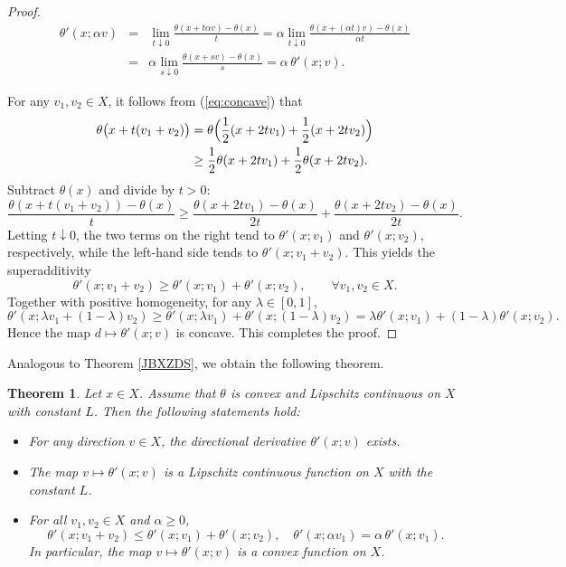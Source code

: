 \documentclass[11pt]{article}
\newtheorem{theorem}{Theorem}[section]
\begin{document}
\begin{proof}
	\begin{eqnarray*}   	\theta'(x;\alpha v) &=&  \lim_{t\downarrow0}\frac{\theta(x+t\alpha v)-\theta(x)}{t}
		= \alpha \lim_{t\downarrow0}\frac{\theta(x+(\alpha t)v)-\theta(x)}{\alpha t}   \\
		&=& \alpha \lim_{s\downarrow0}\frac{\theta(x+s v)-\theta(x)}{s}
		= \alpha\,\theta'(x;v).
	\end{eqnarray*}
	
	
	
	For any $v_1,v_2\in X$,   it follows from  (\ref{eq:concave})  that
	\[
	\begin{aligned}
		\theta\bigl(x+t(v_1+v_2)\bigr)
		&= \theta\Bigl(\frac{1}{2}(x+2tv_1)+\frac{1}{2}(x+2tv_2)\Bigr)\\
		&\ge \frac{1}{2}\theta(x+2tv_1) + \frac{1}{2}\theta(x+2tv_2).
	\end{aligned}
	\]
	Subtract $\theta(x)$ and divide by $t>0$:
	\[
	\frac{\theta(x+t(v_1+v_2))-\theta(x)}{t}
	\ge \frac{\theta(x+2tv_1)-\theta(x)}{2t} + \frac{\theta(x+2tv_2)-\theta(x)}{2t}.
	\]
	Letting $t\downarrow0$, the two terms on the right tend to $\theta'(x;v_1)$ and $\theta'(x;v_2)$, respectively,
	while the left-hand side tends to $\theta'(x;v_1+v_2)$. This yields the superadditivity
	$$		\theta'(x;v_1+v_2) \ge \theta'(x;v_1) + \theta'(x;v_2),\qquad \forall v_1,v_2\in X.	$$
	Together with positive homogeneity, for any $\lambda\in[0,1]$,
	\[
	\theta'(x;\lambda v_1+(1-\lambda) v_2)
	\ge \theta'(x;\lambda v_1) + \theta'(x;(1-\lambda) v_2)
	= \lambda\theta'(x;v_1) + (1-\lambda)\theta'(x; v_2).
	\]
	Hence the map $d\mapsto\theta'(x;v)$ is concave.  	This completes the proof. 
\end{proof}

Analogous to Theorem  \ref{JBXZDS}, we obtain the following theorem.

\begin{theorem}  \label{JBXCOS} 
	Let $x \in X$.	Assume that  $\theta$ is convex and   Lipschitz continuous on $X$ with constant $L$.
	Then	the following statements hold:
	\begin{itemize}
		\item[(i)]  For   any direction $v \in X$, the directional derivative  $	\theta'(x; v)$  exists. 
		\item[(ii)] The map $v \mapsto \theta'( x; v)$ is a Lipschitz continuous   function on $X$ with the   constant $L$.
		\item[(iii)] For all $v_1, v_2 \in X$ and $\alpha \ge 0$,
		\[
		\theta'(x; v_1+v_2) \le \theta'( x; v_1) + \theta'( x; v_2), \quad
		\theta'( x; \alpha v_1) = \alpha \,\theta'( x; v_1).
		\]
		In		particular,   the map $v \mapsto \theta'( x; v)$ is a   convex function on $X$.
	\end{itemize}
\end{theorem}
\end{document}
